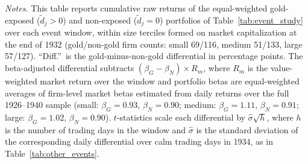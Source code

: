 \begin{table}[htbp]
\begin{minipage}{0.95\textwidth}\footnotesize \textit{Notes.} This table reports cumulative raw returns of the equal-weighted gold-exposed ($\tilde{d}_j>0$) and non-exposed ($\tilde{d}_j=0$) portfolios of Table~\ref{tab:event_study} over each event window, within size terciles formed on market capitalization at the end of 1932 (gold/non-gold firm counts: small 69/116, medium 51/133, large 57/127). ``Diff.''\ is the gold-minus-non-gold differential in percentage points. The beta-adjusted differential subtracts $(\beta_G-\beta_N)\times R_m$, where $R_m$ is the value-weighted market return over the window and portfolio betas are equal-weighted averages of firm-level market betas estimated from daily returns over the full 1926--1940 sample (small: $\beta_G=0.93$, $\beta_N=0.90$; medium: $\beta_G=1.11$, $\beta_N=0.91$; large: $\beta_G=1.02$, $\beta_N=0.90$). $t$-statistics scale each differential by $\hat\sigma\sqrt{h}$, where $h$ is the number of trading days in the window and $\hat\sigma$ is the standard deviation of the corresponding daily differential over calm trading days in 1934, as in Table~\ref{tab:other_events}.\end{minipage}
\end{table}
